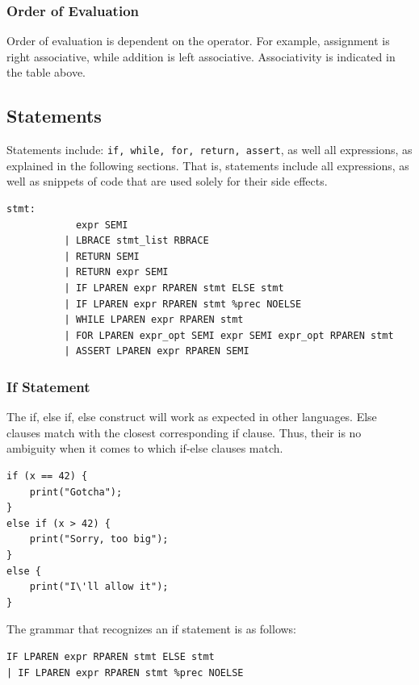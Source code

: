 \documentclass{article}
\begin{document}
\subsubsection{Order of Evaluation}
Order of evaluation is dependent on the operator. For example, assignment is right associative, while addition is left associative. Associativity is indicated in the table above.

\subsection{Statements}
Statements include: \texttt{if, while, for, return, assert}, as well all expressions, as explained in the following sections. That is, statements include all expressions, as well as snippets of code that are used solely for their side effects.

\begin{Verbatim}[frame=single]
stmt:
            expr SEMI                                            
          | LBRACE stmt_list RBRACE                                
          | RETURN SEMI                                           
          | RETURN expr SEMI                                        
          | IF LPAREN expr RPAREN stmt ELSE stmt                    
          | IF LPAREN expr RPAREN stmt %prec NOELSE                 
          | WHILE LPAREN expr RPAREN stmt                          
          | FOR LPAREN expr_opt SEMI expr SEMI expr_opt RPAREN stmt 
          | ASSERT LPAREN expr RPAREN SEMI    

\end{Verbatim}

\subsubsection{If Statement}
The if, else if, else construct will work as expected in other languages. Else clauses match with the closest corresponding if clause. Thus, their is no ambiguity when it comes to which if-else clauses match.

\begin{lstlisting}
if (x == 42) {
	print("Gotcha");
}
else if (x > 42) {
	print("Sorry, too big");
}
else {
	print("I\'ll allow it");
}
\end{lstlisting}

The grammar that recognizes an if statement is as follows:
\begin{Verbatim}[frame=single]
IF LPAREN expr RPAREN stmt ELSE stmt                  
| IF LPAREN expr RPAREN stmt %prec NOELSE   
\end{Verbatim}
\end{document}
